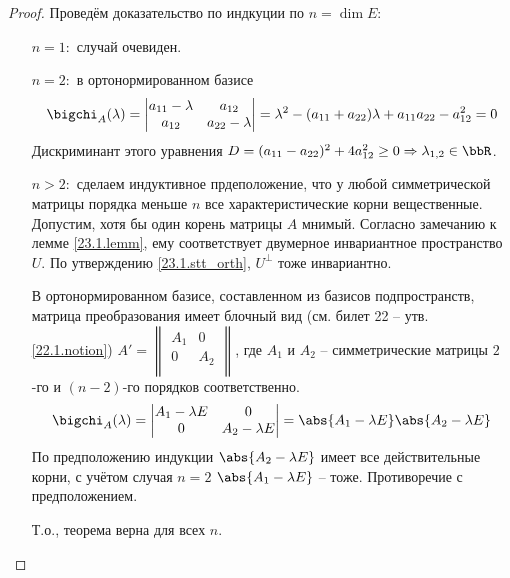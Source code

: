   \begin{proof} Проведём доказательство по индкуции по $n=\dim E$:
  \linebreak\vspace*{-\baselineskip}
  \begin{itemize}
  \item[\underline{$n=1:$}] случай очевиден.
  \item[\underline{$n=2:$}] в ортонормированном базисе
    \begin{equation}
    \bigchi_A(\lambda)=\begin{vmatrix}
    a_{11}-\lambda & a_{12} \\
    a_{12} & a_{22}-\lambda
    \end{vmatrix}=\lambda^2-(a_{11}+a_{22})\lambda+a_{11}a_{22}-a_{12}^2=0 \end{equation}
    Дискриминант этого уравнения $D=(a_{11}-a_{22})^2+4a_{12}^2 \ge 0 \Rightarrow \lambda_{1,2} \in \bbR$.
  \item[\underline{$n>2:$}] сделаем индуктивное прдеположение, что у любой симметрической матрицы порядка меньше $n$ все характеристические корни вещественные. Допустим, хотя бы один корень матрицы $A$ мнимый. Согласно замечанию к лемме \ref{23.1.lemm}, ему соответствует двумерное инвариантное пространство $U$. По утверждению \ref{23.1.stt_orth}, $U^\perp$ тоже инвариантно.
  
  В ортонормированном базисе, составленном из базисов подпространств, матрица преобразования имеет блочный вид (см. билет 22 -- утв. \ref{22.1.notion}) $A'=\begin{Vmatrix}
  A_1 & 0 \\
  0 & A_2 \\
  \end{Vmatrix}$, где $A_1$ и $A_2$ -- симметрические матрицы $2$-го и $(n-2)$-го порядков соответственно.
    \begin{equation}
    \bigchi_A(\lambda)=\begin{vmatrix}
    A_1-\lambda E & 0 \\
    0 & A_2-\lambda E
    \end{vmatrix}=\abs{A_1-\lambda E}\abs{A_2-\lambda E} \end{equation}
    По предположению индукции  $\abs{A_2-\lambda E}$ имеет все действительные корни, с учётом случая \underline{$n=2$} $\abs{A_1-\lambda E}$ -- тоже. Противоречие с предположением. 
    
    Т.о., теорема верна для всех $n$.
  \end{itemize}
  \vspace{-1.65\baselineskip}  
  \end{proof}
  
